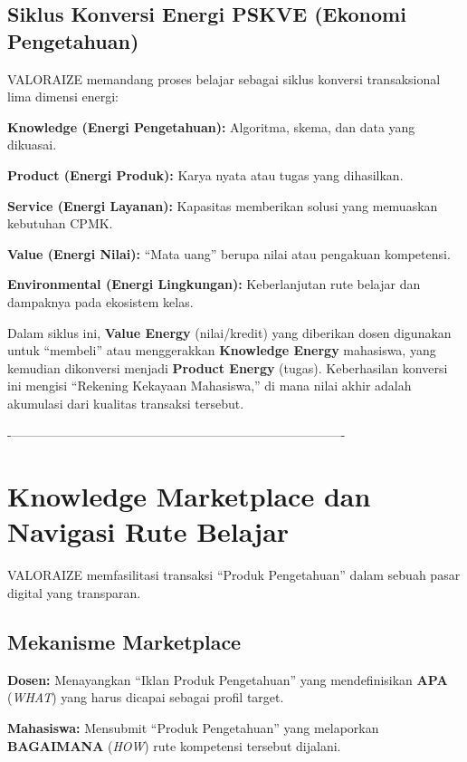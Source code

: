 \documentclass[
  letterpaper,
  DIV=11,
  numbers=noendperiod]{scrreprt}
\begin{document}
\subsection{Siklus Konversi Energi PSKVE (Ekonomi
Pengetahuan)}\label{siklus-konversi-energi-pskve-ekonomi-pengetahuan}

VALORAIZE memandang proses belajar sebagai siklus konversi transaksional
lima dimensi energi:

\textbf{Knowledge (Energi Pengetahuan):} Algoritma, skema, dan data yang
dikuasai.

\textbf{Product (Energi Produk):} Karya nyata atau tugas yang
dihasilkan.

\textbf{Service (Energi Layanan):} Kapasitas memberikan solusi yang
memuaskan kebutuhan CPMK.

\textbf{Value (Energi Nilai):} ``Mata uang'' berupa nilai atau pengakuan
kompetensi.

\textbf{Environmental (Energi Lingkungan):} Keberlanjutan rute belajar
dan dampaknya pada ekosistem kelas.

Dalam siklus ini, \textbf{Value Energy} (nilai/kredit) yang diberikan
dosen digunakan untuk ``membeli'' atau menggerakkan \textbf{Knowledge
Energy} mahasiswa, yang kemudian dikonversi menjadi \textbf{Product
Energy} (tugas). Keberhasilan konversi ini mengisi ``Rekening Kekayaan
Mahasiswa,'' di mana nilai akhir adalah akumulasi dari kualitas
transaksi tersebut.

-\/-------------------------------------------------------------------------------

\section{Knowledge Marketplace dan Navigasi Rute
Belajar}\label{knowledge-marketplace-dan-navigasi-rute-belajar}

VALORAIZE memfasilitasi transaksi ``Produk Pengetahuan'' dalam sebuah
pasar digital yang transparan.

\subsection{Mekanisme Marketplace}\label{mekanisme-marketplace}

\textbf{Dosen:} Menayangkan ``Iklan Produk Pengetahuan'' yang
mendefinisikan \textbf{APA} (\emph{WHAT}) yang harus dicapai sebagai
profil target.

\textbf{Mahasiswa:} Mensubmit ``Produk Pengetahuan'' yang melaporkan
\textbf{BAGAIMANA} (\emph{HOW}) rute kompetensi tersebut dijalani.
\end{document}
